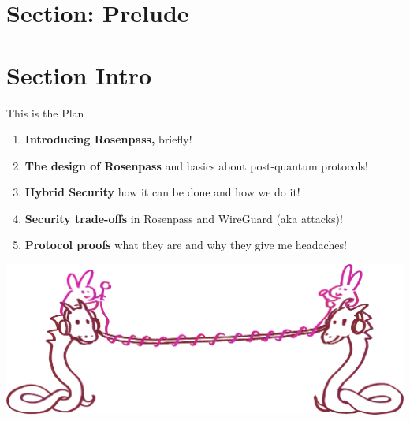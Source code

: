 \newcommand*{\citePqwgUrl}{https://eprint.iacr.org/2020/379}
\newcommand*{\citePqwgCode}{PQWG}
\newcommand*{\citePqwg}{\href{\citePqwgUrl}{[\citePqwgCode]}}

\hypertarget{section-prelude}{%
\section{Section: Prelude}\label{section-prelude}}

\hypertarget{section-intro}{%
\section{Section Intro}\label{section-intro}}

\begin{frame}[s]{This is the Plan}
\hypertarget{todays-talk}{}

\begin{enumerate}
 \setlength{\itemsep}{1ex plus 1 fil}
  \item \textbf{Introducing Rosenpass,} briefly!
  \item \textbf{The design of Rosenpass} and basics about post-quantum protocols!
  \item \textbf{Hybrid Security} how it can be done and how we do it!
  \item \textbf{Security trade-offs} in Rosenpass and WireGuard (aka attacks)!
  \item \textbf{Protocol proofs} what they are and why they give me headaches!
\end{enumerate}

\begin{center}
  \includegraphics[height=.3\textheight]{graphics/wireguard-and-rp-bunny-rose.png}
\end{center}
\end{frame}

